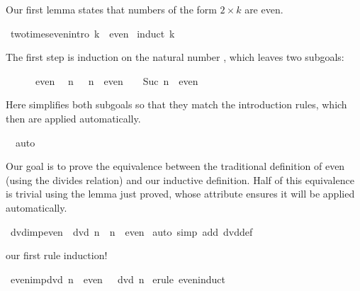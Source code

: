 \begin{isabellebody}
\begin{isamarkuptext}
Our first lemma states that numbers of the form $2\times k$ are even.%
\end{isamarkuptext}%
\ two{\isacharunderscore}times{\isacharunderscore}even{\isacharbrackleft}intro{\isacharbang}{\isacharbrackright}{\isacharcolon}\ {\isachardoublequote}{}{\isacharasterisk}k\ {\isasymin}\ even{\isachardoublequote}\isanewline
{}\ {\isacharparenleft}induct\ {\isachardoublequote}k{\isachardoublequote}{\isacharparenright}%
\begin{isamarkuptxt}%
The first step is induction on the natural number , which leaves
two subgoals:
\begin{isabelle}%
\ {}{\isachardot}\ {}\ {\isacharasterisk}\ {}\ {\isasymin}\ even\isanewline
\ {}{\isachardot}\ {\isasymAnd}n{\isachardot}\ {}\ {\isacharasterisk}\ n\ {\isasymin}\ even\ {\isasymLongrightarrow}\ {}\ {\isacharasterisk}\ Suc\ n\ {\isasymin}\ even%
\end{isabelle}
Here  simplifies both subgoals so that they match the introduction
rules, which then are applied automatically.%
\end{isamarkuptxt}%
\ \ auto\isanewline
{}%
\begin{isamarkuptext}%
Our goal is to prove the equivalence between the traditional definition
of even (using the divides relation) and our inductive definition.  Half of
this equivalence is trivial using the lemma just proved, whose 
attribute ensures it will be applied automatically.%
\end{isamarkuptext}%
\ dvd{\isacharunderscore}imp{\isacharunderscore}even{\isacharcolon}\ {\isachardoublequote}{}\ dvd\ n\ {\isasymLongrightarrow}\ n\ {\isasymin}\ even{\isachardoublequote}\isanewline
{}\ {\isacharparenleft}auto\ simp\ add{\isacharcolon}\ dvd{\isacharunderscore}def{\isacharparenright}%
\begin{isamarkuptext}%
our first rule induction!%
\end{isamarkuptext}%
\ even{\isacharunderscore}imp{\isacharunderscore}dvd{\isacharcolon}\ {\isachardoublequote}n\ {\isasymin}\ even\ {\isasymLongrightarrow}\ {}\ dvd\ n{\isachardoublequote}\isanewline
{}\ {\isacharparenleft}erule\ even{\isachardot}induct{\isacharparenright}%
\begin{isamarkuptxt}%
\begin{isabelle}%

\end{isabelle}
\end{isamarkuptxt}
\end{isabellebody}
